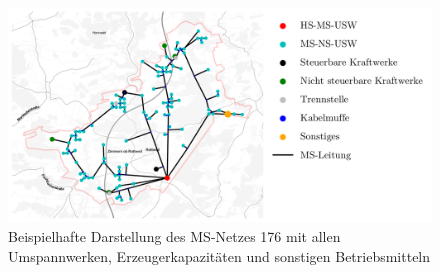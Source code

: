 \begin{figure}[H]
    \centering
    \includegraphics[width=\textwidth]{Bilder/grid_176_map}
    \caption{Beispielhafte Darstellung des MS-Netzes \num{176} mit allen Umspannwerken, Erzeugerkapazitäten und sonstigen Betriebsmitteln}\label{fig:grid_176_map}
\end{figure}